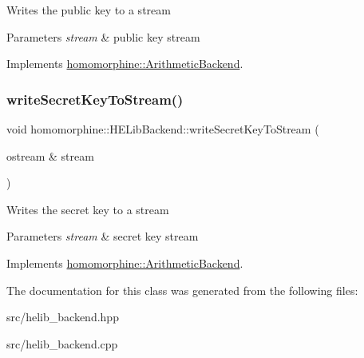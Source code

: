 Writes the public key to a stream


\begin{DoxyParams}{Parameters}
{\em stream} & public key stream \\
\hline
\end{DoxyParams}


Implements \mbox{\hyperlink{classhomomorphine_1_1_arithmetic_backend_a2552b81a08e286969a0ff44428d59af4}{homomorphine\+::\+Arithmetic\+Backend}}.

\mbox{\label{classhomomorphine_1_1_h_e_lib_backend_ac20314b484b23a46ff2070445576f413}} 
\subsubsection{\texorpdfstring{writeSecretKeyToStream()}{writeSecretKeyToStream()}}
{\footnotesize\ttfamily void homomorphine\+::\+H\+E\+Lib\+Backend\+::write\+Secret\+Key\+To\+Stream (\begin{DoxyParamCaption}\item[{ostream \&}]{stream }\end{DoxyParamCaption})\hspace{0.3cm}{\ttfamily [virtual]}}

Writes the secret key to a stream


\begin{DoxyParams}{Parameters}
{\em stream} & secret key stream \\
\hline
\end{DoxyParams}


Implements \mbox{\hyperlink{classhomomorphine_1_1_arithmetic_backend_ad88c797bbb2073ed3af460e568725c3f}{homomorphine\+::\+Arithmetic\+Backend}}.



The documentation for this class was generated from the following files\+:\begin{DoxyCompactItemize}
\item 
src/helib\+\_\+backend.\+hpp\item 
src/helib\+\_\+backend.\+cpp\end{DoxyCompactItemize}
